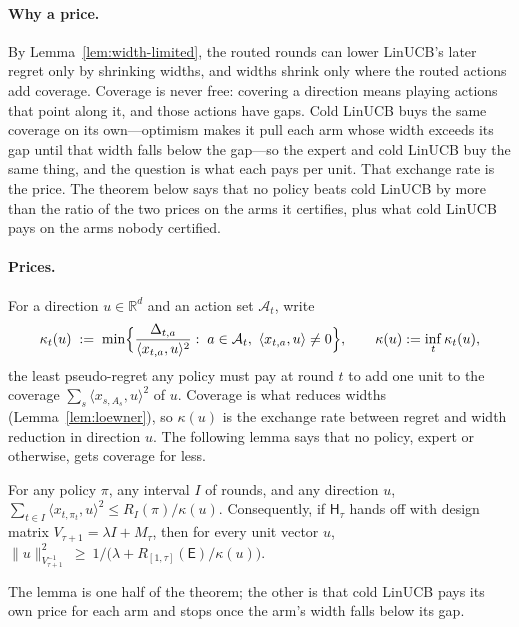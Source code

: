 \documentclass[anon]{alt2027} %
\newcommand{\R}{\mathbb{R}}
\newcommand{\Exp}{\mathsf{E}}
\newcommand{\Hyb}{\mathsf{H}}
\begin{document}
\paragraph{Why a price.}
By Lemma~\ref{lem:width-limited}, the routed rounds can lower LinUCB's later
regret only by shrinking widths, and widths shrink only where the routed
actions add coverage. Coverage is never free: covering a direction means
playing actions that point along it, and those actions have gaps. Cold
LinUCB buys the same coverage on its own---optimism makes it pull each arm
whose width exceeds its gap until that width falls below the gap---so the
expert and cold LinUCB buy the same thing, and the question is what each pays
per unit. That exchange rate is the price. The theorem below says that no
policy beats cold LinUCB by more than the ratio of the two prices on the
arms it certifies, plus what cold LinUCB pays on the arms nobody certified.

\paragraph{Prices.}
For a direction $u\in\R^d$ and an
action set $\mathcal A_t$, write
\begin{equation}
\label{eq:price}
\kappa_t(u)\;:=\;\min\Bigl\{\frac{\Delta_{t,a}}{\langle x_{t,a},u\rangle^2}:\;a\in\mathcal A_t,\ \langle x_{t,a},u\rangle\neq0\Bigr\},
\qquad \kappa(u):=\inf_t\kappa_t(u),
\end{equation}
the least pseudo-regret any policy must pay at round $t$ to add one unit to
the coverage $\sum_s\langle x_{s,A_s},u\rangle^2$ of $u$. Coverage is what
reduces widths (Lemma~\ref{lem:loewner}), so $\kappa(u)$ is the exchange rate
between regret and width reduction in direction $u$. The following lemma
says that no policy, expert or otherwise, gets coverage for less.

\begin{lemma}
\label{lem:no-free-coverage}
For any policy $\pi$, any interval $I$ of rounds, and any direction $u$,
$\sum_{t\in I}\langle x_{t,\pi_t},u\rangle^2\le R_I(\pi)/\kappa(u)$.
Consequently, if $\Hyb_\tau$ hands off with design matrix $V_{\tau+1}=\lambda I+M_\tau$, then
for every unit vector $u$,
$\|u\|^2_{V_{\tau+1}^{-1}}\ \ge\ 1\big/\bigl(\lambda+R_{[1,\tau]}(\Exp)/\kappa(u)\bigr)$.
\end{lemma}

The lemma is one half of the theorem; the other is that cold LinUCB
pays its own price for each arm and stops once the arm's width falls below
its gap.
\end{document}
